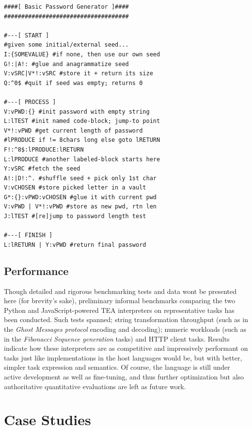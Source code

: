 \documentclass[sigplan,screen]{acmart}
\begin{document}
\begin{lstlisting}[style=tea,caption=Basic 8-character Password Generator, label=LST3]
####[ Basic Password Generator ]####
####################################

#---[ START ]
#given some initial/external seed...
I:{SOMEVALUE} #if none, then use our own seed
G!:|A!: #glue and anagrammatize seed
V:vSRC|V*!:vSRC #store it + return its size
Q:^0$ #quit if seed was empty; returns 0

#---[ PROCESS ]
V:vPWD:{} #init password with empty string
L:lTEST #init named code-block; jump-to point
V*!:vPWD #get current length of password
#lPRODUCE if != 8chars long else goto lRETURN
F!:^8$:lPRODUCE:lRETURN 
L:lPRODUCE #another labeled-block starts here
Y:vSRC #fetch the seed
A!:|D!:^. #shuffle seed + pick only 1st char
V:vCHOSEN #store picked letter in a vault
G*:{}:vPWD:vCHOSEN #glue it with current pwd
V:vPWD | V*!:vPWD #store as new pwd, rtn len
J:lTEST #[re]jump to password length test

#---[ FINISH ]
L:lRETURN | Y:vPWD #return final password
\end{lstlisting}



\subsection{Performance}

Though detailed and rigorous benchmarking tests and data wont be presented here (for brevity's sake), preliminary informal benchmarks comparing the two Python and JavaScript-powered TEA interpreters on representative tasks has been conducted. Such tests spanned; string transformation throughput (such as in the \textit{Ghost Messages protocol} encoding and decoding); numeric workloads (such as in the \textit{Fibonacci Sequence generation} tasks) and HTTP client tasks. Results indicate how these interpreters are as competitive and impressively performant on tasks just like implementations in the host languages would be, but with better, simpler task expression and semantics. Of course, the language is still under active development as well as fine-tuning, and thus further optimization but also authoritative quantitative evaluations are  left as future work.

\section{Case Studies}
\label{SEC7}
\end{document}
